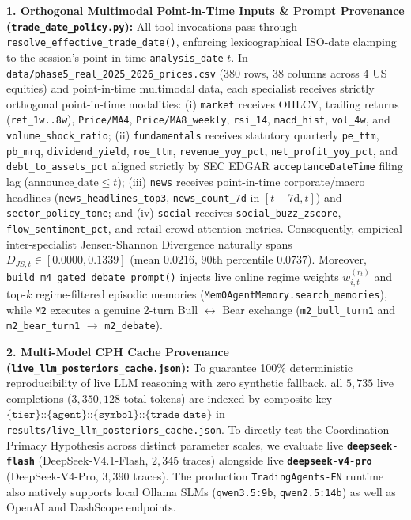 \documentclass[10pt,a4paper,twocolumn]{article}
\begin{document}
\noindent\textbf{1. Orthogonal Multimodal Point-in-Time Inputs \& Prompt Provenance (\texttt{trade\_date\_policy.py}):} All tool invocations pass through \texttt{resolve\_effective\_trade\_date()}, enforcing lexicographical ISO-date clamping to the session's point-in-time \texttt{analysis\_date} $t$. In \texttt{data/phase5\_real\_2025\_2026\_prices.csv} ($380$ rows, 38 columns across 4 US equities) and point-in-time multimodal data, each specialist receives strictly orthogonal point-in-time modalities: (i) \texttt{market} receives OHLCV, trailing returns (\texttt{ret\_1w..8w}), \texttt{Price/MA4}, \texttt{Price/MA8\_weekly}, \texttt{rsi\_14}, \texttt{macd\_hist}, \texttt{vol\_4w}, and \texttt{volume\_shock\_ratio}; (ii) \texttt{fundamentals} receives statutory quarterly \texttt{pe\_ttm}, \texttt{pb\_mrq}, \texttt{dividend\_yield}, \texttt{roe\_ttm}, \texttt{revenue\_yoy\_pct}, \texttt{net\_profit\_yoy\_pct}, and \texttt{debt\_to\_assets\_pct} aligned strictly by SEC EDGAR \texttt{acceptanceDateTime} filing lag ($\text{announce\_date} \le t$); (iii) \texttt{news} receives point-in-time corporate/macro headlines (\texttt{news\_headlines\_top3}, \texttt{news\_count\_7d} in $[t-7\text{d}, t]$) and \texttt{sector\_policy\_tone}; and (iv) \texttt{social} receives \texttt{social\_buzz\_zscore}, \texttt{flow\_sentiment\_pct}, and retail crowd attention metrics. Consequently, empirical inter-specialist Jensen-Shannon Divergence naturally spans $D_{JS,t} \in [0.0000, 0.1339]$ (mean $0.0216$, 90th percentile $0.0737$). Moreover, \texttt{build\_m4\_gated\_debate\_prompt()} injects live online regime weights $w_{i,t}^{(r_t)}$ and top-$k$ regime-filtered episodic memories (\texttt{Mem0AgentMemory.search\_memories}), while \texttt{M2} executes a genuine 2-turn Bull $\leftrightarrow$ Bear exchange (\texttt{m2\_bull\_turn1} and \texttt{m2\_bear\_turn1} $\to$ \texttt{m2\_debate}).

\noindent\textbf{2. Multi-Model CPH Cache Provenance (\texttt{live\_llm\_posteriors\_cache.json}):} To guarantee 100\% deterministic reproducibility of live LLM reasoning with zero synthetic fallback, all $5,735$ live completions ($3,350,128$ total tokens) are indexed by composite key $\texttt{\{tier\}::\{agent\}::\{symbol\}::\{trade\_date\}}$ in \texttt{results/live\_llm\_posteriors\_cache.json}. To directly test the Coordination Primacy Hypothesis across distinct parameter scales, we evaluate live \textbf{\texttt{deepseek-flash}} (DeepSeek-V4.1-Flash, $2,345$ traces) alongside live \textbf{\texttt{deepseek-v4-pro}} (DeepSeek-V4-Pro, $3,390$ traces). The production \texttt{TradingAgents-EN} runtime also natively supports local Ollama SLMs (\texttt{qwen3.5:9b}, \texttt{qwen2.5:14b}) as well as OpenAI and DashScope endpoints.
\end{document}
